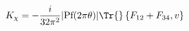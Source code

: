 \begin{equation}
 K_\chi=-\frac{i}{32\pi^2}|\text{Pf}(2\pi\theta)|
 \Tr{}\,\{F_{12}+F_{34},v\}
\end{equation}

